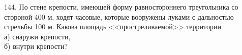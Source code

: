 144. По стене крепости, имеющей форму равностороннего треугольника со стороной 400 м, ходят часовые, которые вооружены луками с дальностью стрельбы 100 м. Какова площадь <<простреливаемой>> территории\\
а) снаружи крепости,\\
б) внутри крепости?\\

